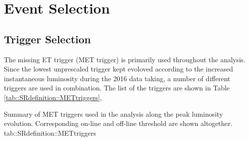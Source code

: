 \clearpage
\section{Event Selection} \label{sec::SRdefinition}

\subsection{Trigger Selection} \label{sec::SRdefinition::trigger}
The missing ET trigger (MET trigger) is primarily used throughout the analysis.
Since the lowest unprescaled trigger kept evoloved according to the increased instantaneous luminosity during the 2016 data taking, a number of different triggers are used in combination.
The list of the triggers are shown in Table \ref{tab::SRdefinition::METtriggers},

{Summary of MET triggers used in the analysis along the peak luminosity evolution. Corresponding on-line and off-line threshold are shown altogether.}
{tab::SRdefinition::METtriggers}


